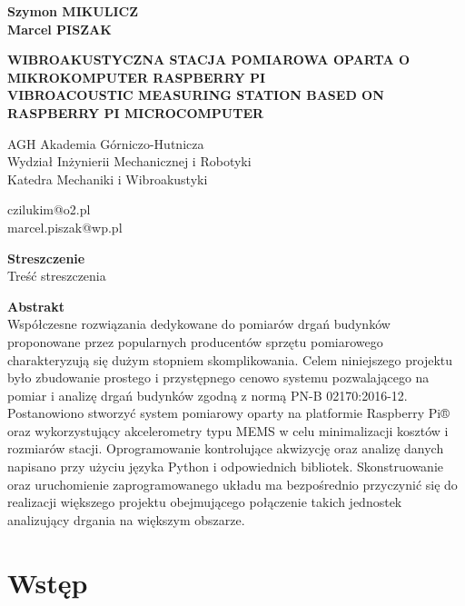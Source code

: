 \documentclass[a4paper,12pt]{mwart}
\begin{document}
\onehalfspacing
\begin{flushleft}

\textbf{Szymon \MakeUppercase{Mikulicz}} \\
\textbf{Marcel \MakeUppercase{Piszak}} \\
\vspace*{12pt}

\MakeUppercase{\textbf{Wibroakustyczna stacja pomiarowa oparta o mikrokomputer Raspberry Pi}} \\
\vspace*{6pt}
\MakeUppercase{\textbf{Vibroacoustic measuring station based on Raspberry Pi microcomputer}} \\
\vspace*{12pt}

AGH Akademia Górniczo-Hutnicza \\
Wydział Inżynierii Mechanicznej i Robotyki \\
Katedra Mechaniki i Wibroakustyki \\
\vspace*{6pt}

czilukim@o2.pl \\
marcel.piszak@wp.pl \\

\end{flushleft}

\noindent
\textbf{Streszczenie} \\
Treść streszczenia
\vspace*{24pt}

\noindent
\textbf{Abstrakt} \\
Współczesne rozwiązania dedykowane do pomiarów drgań budynków proponowane przez
popularnych producentów sprzętu pomiarowego charakteryzują się dużym stopniem
skomplikowania. Celem niniejszego projektu było zbudowanie prostego i
przystępnego cenowo systemu pozwalającego na pomiar i analizę drgań budynków
zgodną z normą PN-B 02170:2016-12. Postanowiono stworzyć system pomiarowy
oparty na platformie Raspberry Pi® oraz wykorzystujący akcelerometry typu MEMS
w celu minimalizacji kosztów i rozmiarów stacji. Oprogramowanie kontrolujące
akwizycję oraz analizę danych napisano przy użyciu języka Python i odpowiednich
bibliotek. Skonstruowanie oraz uruchomienie zaprogramowanego układu ma
bezpośrednio przyczynić się do realizacji większego projektu obejmującego
połączenie takich jednostek analizujący drgania na większym obszarze.
\vspace*{24pt}


\section{Wstęp}
\end{document}
